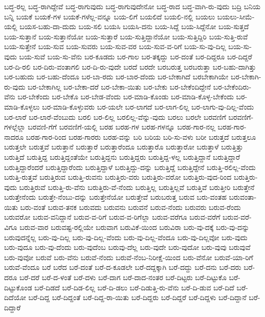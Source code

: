 {ಬದ್ಧ-ರಲ್ಲ
ಬದ್ಧ-ರಾಗಿದ್ದೇವೆ
ಬದ್ಧ-ರಾಗುವುದು
ಬದ್ಧ-ರಾಗುವುದೇನೋ
ಬದ್ಧ-ರಾದ
ಬದ್ಧ-ವಾಗಿ-ರು-ವುದು
ಬದ್ರಿ
ಬನಿಯ
ಬನ್ನಿ
ಬಯಕೆ
ಬಯಕೆ-ಗಳ
ಬಯಕೆ-ಗಳೆಲ್ಲ-ವನ್ನೂ
ಬಯ-ಲಿಗೆ
ಬಯಲಿದೆ
ಬಯಲಿ-ನಲ್ಲಿ
ಬಯಲು
ಬಯಲು-ಸೀಮೆ-ಯಲ್ಲಿ
ಬಯಸ-ಬಹು-ದಾ-ದುದು
ಬಯ-ಸಲಿ
ಬಯಸಿ
ಬಯಸಿ-ದನು
ಬಯ-ಸಿದ್ದೆ
ಬಯ-ಸಿದ್ದೆನೋ
ಬಯ-ಸುತ್ತದೆ
ಬಯ-ಸುತ್ತಾನೆ
ಬಯ-ಸುತ್ತಾನೆಯೋ
ಬಯ-ಸುತ್ತಾರೆ
ಬಯ-ಸುತ್ತಿದ್ದಾನೆಯೋ
ಬಯ-ಸುತ್ತಿದ್ದಿರಿ
ಬಯ-ಸುತ್ತಿ-ರುವೆ
ಬಯ-ಸುತ್ತೇನೆ
ಬಯ-ಸುವ
ಬಯ-ಸುವರು
ಬಯ-ಸುವ-ವರ
ಬಯ-ಸುವ-ವ-ರಿಗೆ
ಬಯ-ಸು-ವು-ದಿಲ್ಲ
ಬಯ-ಸು-ವುದು
ಬಯ-ಸುವೆ
ಬಯ-ಸು-ವೆನು
ಬರ-ಕೂಡದು
ಬರ-ಗಾಲ
ಬರ-ತಕ್ಕದ್ದು
ಬರ-ದಂತೆ
ಬರ-ದಿದ್ದರೂ
ಬರ-ದಿದ್ದರೆ
ಬರ-ದಿ-ರಲಿ
ಬರ-ದಿರು-ವಂತಾಗಲಿ
ಬರ-ದಿ-ರು-ವುದೇ
ಬರದೆ
ಬರದೇ
ಬರಬರುತ್ತ
ಬರಬರುತ್ತಾ
ಬರ-ಬಹು-ದಾಗಿತ್ತು
ಬರ-ಬಹುದು
ಬರ-ಬಹು-ದೆಂದೂ
ಬರ-ಬಾ-ರದು
ಬರ-ಬಾರ-ದೆಂದು
ಬರ-ಬೇಕಾಗಿದೆ
ಬರಬೇಕಾಗಿಯೇ
ಬರ-ಬೇಕಾಗಿ-ರು-ವುದು
ಬರ-ಬೇಕಾಗಿಲ್ಲ
ಬರ-ಬೇಕಾ-ದರೆ
ಬರ-ಬೇಕಾ-ಯಿತು
ಬರ-ಬೇಕು
ಬರ-ಬೇಕೆಂದಿದ್ದೇನೆ
ಬರ-ಬೇಕೆಂದಿರು-ವೆನು
ಬರ-ಬೇಕೆಂದು
ಬರ-ಬೇಕೊ
ಬರ-ಬೇಡ-ವೆಂದು
ಬರ-ಮಾಡಿ-ಕೊಂಡು
ಬರ-ಮಾಡಿ-ಕೊಳ್ಳ-ಬೇಕೆಂದು
ಬರ-ಮಾಡಿ-ಕೊಳ್ಳಲು
ಬರ-ಮಾಡಿ-ಕೊಳ್ಳುವರು
ಬರ-ಯಲೇ
ಬರ-ಲಾಗದೆ
ಬರ-ಲಾಗ-ಲಿಲ್ಲ
ಬರ-ಲಾಗು-ವು-ದಿಲ್ಲ-ವೆಂದು
ಬರ-ಲಾರೆ
ಬರ-ಲಾರೆ-ವೆಂಬುದು
ಬರಲಿ
ಬರ-ಲಿಲ್ಲ
ಬರಲಿಲ್ಲ-ವೆನ್ನು-ವುದು
ಬರಲು
ಬರಲೇ
ಬರವಣಿಗೆ
ಬರವಣಿಗೆ-ಗಳಲ್ಲೆಲ್ಲಾ
ಬರವಣಿ-ಗೆಗೆ
ಬರವಣಿಗೆ-ಯಲ್ಲಿ
ಬರಹ
ಬರಹ-ಗಳ
ಬರಹ-ಗಳನ್ನೂ
ಬರಹ-ಗಾರ-ನಲ್ಲ
ಬರಹ-ಗಾರ-ನಾದರೂ
ಬರಹ-ಗಾರ-ರಿಂದ
ಬರಹ-ಗಾರರು
ಬರಹ-ವನ್ನು
ಬರಿ
ಬರಿಯ
ಬರಿ-ಸು-ವಳು
ಬರೀ
ಬರುತ್ತದೆ
ಬರುತ್ತಲೂ
ಬರುತ್ತಲೇ
ಬರುತ್ತವೆ
ಬರುತ್ತಾನೆ
ಬರುತ್ತಾರೆ
ಬರುತ್ತಾರೆಂದೂ
ಬರುತ್ತಾರೊ
ಬರುತ್ತಾರೋ
ಬರುತ್ತಾಳೆ
ಬರುತ್ತಿತ್ತು
ಬರುತ್ತಿದೆ
ಬರುತ್ತಿದ್ದ
ಬರುತ್ತಿದ್ದಂತೆಯೇ
ಬರುತ್ತಿದ್ದನು
ಬರುತ್ತಿದ್ದರು
ಬರುತ್ತಿದ್ದ-ಳಲ್ಲ
ಬರುತ್ತಿದ್ದಾನೆ
ಬರುತ್ತಿದ್ದಾರೆ
ಬರುತ್ತಿದ್ದಾರೆಂದರೆ
ಬರುತ್ತಿದ್ದಾರೆಂದು
ಬರುತ್ತಿದ್ದಾಳೆ
ಬರುತ್ತಿದ್ದು-ದನ್ನು
ಬರುತ್ತಿದ್ದೆ
ಬರುತ್ತಿದ್ದೇನೆ
ಬರುತ್ತಿ-ರಲಿಲ್ಲ-ವೆಂದು
ಬರುತ್ತಿ-ರುತ್ತವೆ
ಬರುತ್ತಿರುವ
ಬರುತ್ತಿ-ರುವನು
ಬರುತ್ತಿರು-ವರು
ಬರುತ್ತಿರು-ವರೋ
ಬರುತ್ತಿರು-ವುದ-ರಿಂದ
ಬರುತ್ತಿರು-ವುದು
ಬರುತ್ತಿರುವೆ
ಬರುತ್ತಿ-ರು-ವೆನು
ಬರುತ್ತಿರು-ವೆ-ನೆಂದು
ಬರುತ್ತಿಲ್ಲ
ಬರುತ್ತಿಲ್ಲವೆ
ಬರುತ್ತಿವೆ
ಬರುತ್ತೀರಿ
ಬರುತ್ತೇನೆ
ಬರುತ್ತೇನೆಂದು
ಬರುತ್ತೇ-ನೆಂಬು-ದನ್ನು
ಬರುತ್ತೇನೆಯೋ
ಬರುತ್ತೇವೆ
ಬರುಬರುತ್ತ
ಬರುವ
ಬರು-ವಂತಹ
ಬರುವಂತಾ-ಯಿತು
ಬರು-ವಂತೆ
ಬರುವ-ತನಕ
ಬರುವದು
ಬರುವನು
ಬರುವನೆ
ಬರುವ-ನೆಂದು
ಬರುವರು
ಬರುವ-ರೆಂದು
ಬರುವರೋ
ಬರುವ-ವನಿದ್ದಾನೆ
ಬರುವ-ವ-ರಿಗೆ
ಬರುವ-ವ-ರಿಗೆಲ್ಲಾ
ಬರುವ-ವರೆಗೂ
ಬರುವ-ವರೆಗೆ
ಬರುವ-ವರೆ-ವಿಗೂ
ಬರುವ-ವಾರ
ಬರುವಷ್ಟ-ರಲ್ಲಿಯೇ
ಬರುವಾಗ
ಬರುವಿಕೆ-ಯಿಂದ
ಬರುವಿರಾ
ಬರು-ವು-ದಕ್ಕೆ
ಬರು-ವು-ದನ್ನು
ಬರುವುದನ್ನೆಲ್ಲ
ಬರು-ವು-ದಿಲ್ಲ
ಬರು-ವು-ದಿಲ್ಲ-ವೆಂದು
ಬರು-ವು-ದಿಲ್ಲ-ವೆಂದೂ
ಬರು-ವು-ದಿಲ್ಲವೋ
ಬರು-ವುದು
ಬರು-ವುದೂ
ಬರು-ವು-ದೆಂದು
ಬರು-ವುದೆಂಬ
ಬರುವು-ದೆಲ್ಲ
ಬರು-ವುದೇ
ಬರು-ವುದೋ
ಬರು-ವುವು
ಬರುವುವೆ
ಬರು-ವುವೋ
ಬರುವೆ
ಬರು-ವೆನು
ಬರುವೆ-ನೆಂದು
ಬರುವೆ-ನೆಂಬ-ನಿರೀಕ್ಷೆ-ಯಿಂದ
ಬರು-ವೆನೋ
ಬರುವೆ-ಯಾ-ರಿಗೆ
ಬರುವೆ-ವೆಂದೂ
ಬರೆ
ಬರೆದ
ಬರೆ-ದಂತೆ
ಬರೆ-ದ-ಕೂಡಲೇ
ಬರೆ-ದದ್ದಕ್ಕಾಗಿ
ಬರೆ-ದದ್ದು
ಬರೆ-ದನು
ಬರೆ-ದರು
ಬರೆ-ದರೂ
ಬರೆ-ದರೆ
ಬರೆ-ದ-ಳಂತೆ
ಬರೆ-ದಳು
ಬರೆ-ದಾಗ
ಬರೆ-ದಾದ-ನಂತರ
ಬರೆ-ದಿಟ್ಟರು
ಬರೆ-ದಿಟ್ಟುಕೊ
ಬರೆ-ದಿಟ್ಟುಕೊಂಡ
ಬರೆ-ದಿಡದೆ
ಬರೆ-ದಿಡ-ಲಿಲ್ಲ
ಬರೆ-ದಿ-ಡಲು
ಬರೆ-ದಿಡುತ್ತಿ-ರು-ವೆನು
ಬರೆ-ದಿ-ಡುವ
ಬರೆ-ದಿದೆ
ಬರೆ-ದಿದೆಯೋ
ಬರೆ-ದಿದ್ದ
ಬರೆ-ದಿದ್ದಂತೆ
ಬರೆ-ದಿದ್ದ-ರಾ-ಯಿತು
ಬರೆ-ದಿದ್ದರು
ಬರೆ-ದಿದ್ದರೆ
ಬರೆ-ದಿದ್ದಳು
ಬರೆ-ದಿದ್ದಾನೆ
ಬರೆ-ದಿದ್ದಾರೆ
}
